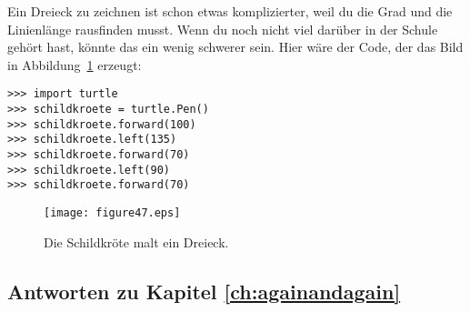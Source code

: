 \noindent
Ein Dreieck zu zeichnen ist schon etwas komplizierter, weil du die Grad und die Linienlänge rausfinden musst. Wenn du noch nicht viel darüber in der Schule gehört hast, könnte das ein wenig schwerer sein. Hier wäre der Code, der das Bild in Abbildung~\ref{fig47} erzeugt:

\begin{listing}
\begin{verbatim}
>>> import turtle
>>> schildkroete = turtle.Pen()
>>> schildkroete.forward(100)
>>> schildkroete.left(135)
>>> schildkroete.forward(70)
>>> schildkroete.left(90)
>>> schildkroete.forward(70)
\end{verbatim}
\end{listing}

\begin{figure}
\begin{center}
\texttt{[image: figure47.eps]}
\end{center}
\caption{Die Schildkröte malt ein Dreieck.}\label{fig47}
\end{figure}

\subsection*{Antworten zu Kapitel \ref{ch:againandagain}}

